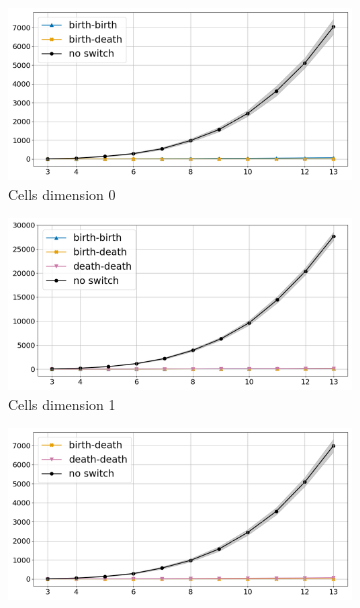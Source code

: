 \documentclass{article}
\begin{document}
\begin{figure}[htbp]
\centering
\begin{subfigure}[b]{0.3\textwidth}
    \includegraphics[width=\linewidth]{pics/torus-transpositions-extended/transposition-types-complex-dim2-subposet-dim0-drop-no-switches-False.png}
    \caption{Cells dimension 0}
    \label{fig:complex2cells0}
\end{subfigure}
\hfill
\begin{subfigure}[b]{0.3\textwidth}
    \includegraphics[width=\linewidth]{pics/torus-transpositions-extended/transposition-types-complex-dim2-subposet-dim1-drop-no-switches-False.png}
    \caption{Cells dimension 1}
    \label{fig:complex2cells1}
\end{subfigure}
\hfill
\begin{subfigure}[b]{0.3\textwidth}
    \includegraphics[width=\linewidth]{pics/torus-transpositions-extended/transposition-types-complex-dim2-subposet-dim2-drop-no-switches-False.png}

\end{subfigure}
\end{figure}
\end{document}
